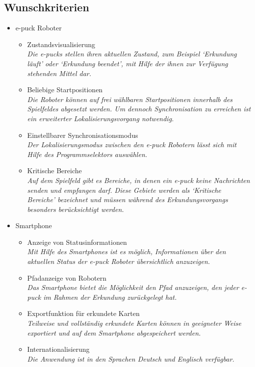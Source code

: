 \documentclass[10pt,a4paper]{article}
\begin{document}
		\subsection{Wunschkriterien}
			\begin{itemize}
				\item e-puck Roboter
				\begin{itemize}					
					\item Zustandsvisualisierung
						\\ \textsl{Die e-pucks stellen ihren aktuellen Zustand, zum Beispiel `Erkundung läuft' oder `Erkundung
							beendet', mit Hilfe der ihnen zur Verfügung stehenden Mittel dar.}										
					\item Beliebige Startpositionen
						\\ \textsl{Die Roboter können auf frei wählbaren Startpositionen innerhalb des Spielfeldes
							abgesetzt werden. Um dennoch Synchronisation zu erreichen ist ein erweiterter Lokalisierungsvorgang
							notwendig.}
					\item Einstellbarer Synchronisationsmodus
						\\ \textsl{Der Lokalisierungsmodus zwischen den e-puck Robotern lässt sich mit Hilfe des Programmselektors auswählen.}		
					\item Kritische Bereiche
						\\ \textsl{Auf dem Spielfeld gibt es Bereiche, in denen ein e-puck keine Nachrichten senden
							und empfangen darf. Diese Gebiete werden als `Kritische Bereiche' bezeichnet und müssen
							während des Erkundungsvorgangs besonders berücksichtigt werden.}									
				\end{itemize}
				\item Smartphone
				\begin{itemize}
					\item Anzeige von Statusinformationen
						\\ \textsl{Mit Hilfe des Smartphones ist es möglich, Informationen über den aktuellen Status der e-puck Roboter
							übersichtlich anzuzeigen.}		
					\item Pfadanzeige von Robotern
						\\ \textsl{Das Smartphone bietet die Möglichkeit den Pfad anzuzeigen, den jeder e-puck im Rahmen der
							Erkundung zurückgelegt hat.}							
					\item Exportfunktion für erkundete Karten
						\\ \textsl{Teilweise und vollständig erkundete Karten können in geeigneter Weise exportiert und auf dem
							Smartphone abgespeichert werden.}		
					\item Internationalisierung
						\\ \textsl{Die Anwendung ist in den Sprachen Deutsch und Englisch verfügbar.}									
				\end{itemize}
			\end{itemize}
\end{document}
